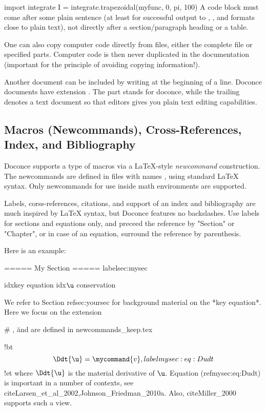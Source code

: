 \documentclass[%
oneside,                 %
final,                   %
10pt]{article}
\begin{document}
import integrate
I = integrate.trapezoidal(myfunc, 0, pi, 100)
\epycod
A code block must come after some plain sentence (at least for successful
output to , , and formats close to plain text),
not directly after a section/paragraph heading or a table.


One can also copy computer code directly from files, either the
complete file or specified parts.  Computer code is then never
duplicated in the documentation (important for the principle of
avoiding copying information!).

Another document can be included by writing 
at the beginning of a line.  Doconce documents have
extension . The  part stands for doconce, while the
trailing  denotes a text document so that editors gives you
plain text editing capabilities.


\subsection{Macros (Newcommands), Cross-References, Index, and Bibliography}
\label{newcommands}

Doconce supports a type of macros via a LaTeX-style \emph{newcommand}
construction.  The newcommands are defined in files with names
, using standard {\LaTeX} syntax. Only newcommands
for use inside math environments are supported.

Labels, corss-references, citations, and support of an index and
bibliography are much inspired by {\LaTeX} syntax, but Doconce features
no backslashes. Use labels for sections and equations only, and
preceed the reference by "Section" or "Chapter", or in case of
an equation, surround the reference by parenthesis.

Here is an example:

\bccq
===== My Section =====
label{sec:mysec}

idx{key equation} idx{$\u$ conservation}

We refer to Section ref{sec:yoursec} for background material on
the *key equation*. Here we focus on the extension

# \Ddt, \u and \mycommand are defined in newcommands_keep.tex

!bt
\begin{equation}
\Ddt{\u} = \mycommand{v},
label{mysec:eq:Dudt}
\end{equation}
!et
where $\Ddt{\u}$ is the material derivative of $\u$.
Equation (ref{mysec:eq:Dudt}) is important in a number
of contexts, see cite{Larsen_et_al_2002,Johnson_Friedman_2010a}.
Also, cite{Miller_2000} supports such a view.
\end{document}
